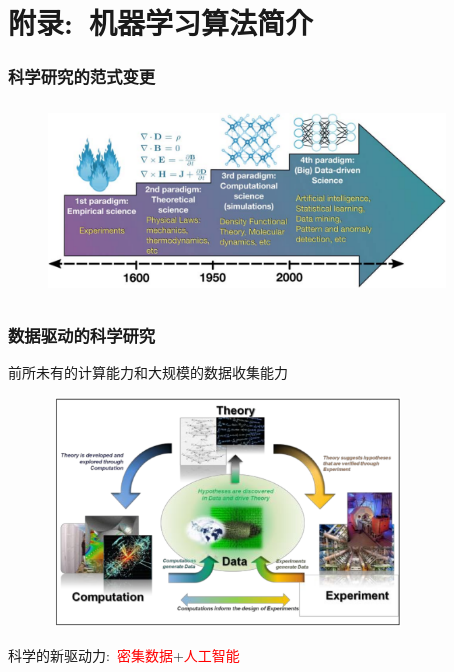 {{\section{附录:~机器学习算法简介}
\frame
{
	\frametitle{科学研究的范式变更}
\begin{figure}[h!]
\vspace*{0.08in}
\centering
\includegraphics[height=2.00in,width=4.15in]{Figures/Four_Model_3.png}
\label{Four_Model}
\end{figure}
}

\frame
{
	\frametitle{数据驱动的科学研究}
前所未有的计算能力和大规模的数据收集能力%
\begin{figure}[h!]
\centering
\includegraphics[height=2.40in,width=3.75in]{Figures/Four_Model_1.png}
\label{Four_Model_1}
\end{figure}
科学的新驱动力:~\textcolor{red}{密集数据}+\textcolor{red}{人工智能}
}

}}
